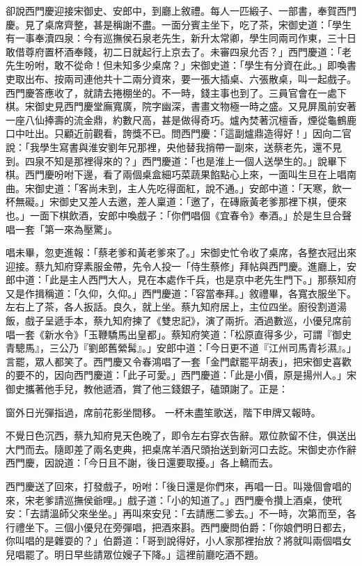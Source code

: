 卻說西門慶迎接宋御史、安郎中，到廳上敘禮。每人一匹緞子、一部書，奉賀西門慶。見了桌席齊整，甚是稱謝不盡。一面分賓主坐下，吃了茶，宋御史道：「學生有一事奉瀆四泉：今有巡撫侯石泉老先生，新升太常卿，學生同兩司作東，三十日敢借尊府置杯酒奉餞，初二日就起行上京去了。未審四泉允否？」西門慶道：「老先生吩咐，敢不從命！但未知多少桌席？」宋御史道：「學生有分資在此。」即喚書吏取出布、按兩司連他共十二兩分資來，要一張大插桌、六張散桌，叫一起戲子。西門慶答應收了，就請去捲棚坐的。不一時，錢主事也到了。三員官會在一處下棋。宋御史見西門慶堂廡寬廣，院字幽深，書畫文物極一時之盛。又見屏風前安著一座八仙捧壽的流金鼎，約數尺高，甚是做得奇巧。爐內焚著沉檀香，煙從龜鶴鹿口中吐出。只顧近前觀看，誇獎不已。問西門慶：「這副爐鼎造得好！」因向二官說：「我學生寫書與淮安劉年兄那裡，央他替我捎帶一副來，送蔡老先，還不見到。四泉不知是那裡得來的？」西門慶道：「也是淮上一個人送學生的。」說畢下棋。西門慶吩咐下邊，看了兩個桌盒細巧菜蔬果餡點心上來，一面叫生旦在上唱南曲。宋御史道：「客尚未到，主人先吃得面紅，說不通。」安郎中道：「天寒，飲一杯無礙。」宋御史又差人去邀，差人稟道：「邀了，在磚廠黃老爹那裡下棋，便來也。」一面下棋飲酒，安郎中喚戲子：「你們唱個《宜春令》奉酒。」於是生旦合聲唱一套「第一來為壓驚」。

唱未畢，忽吏進報：「蔡老爹和黃老爹來了。」宋御史忙令收了桌席，各整衣冠出來迎接。蔡九知府穿素服金帶，先令人投一「侍生蔡修」拜帖與西門慶。進廳上，安郎中道：「此是主人西門大人，見在本處作千兵，也是京中老先生門下。」那蔡知府又是作揖稱道：「久仰，久仰。」西門慶道：「容當奉拜。」敘禮畢，各寬衣服坐下。左右上了茶，各人扳話。良久，就上坐。蔡九知府居上，主位四坐。廚役割道湯飯，戲子呈遞手本，蔡九知府揀了《雙忠記》，演了兩折。酒過數巡，小優兒席前唱一套《新水令》「玉鞭驕馬出皇都」。蔡知府笑道：「松原直得多少，可謂『御史青驄馬』，三公乃『劉郎舊縈髯』。」安郎中道：「今日更不道『江州司馬青衫濕』。」言罷，眾人都笑了。西門慶又令春鴻唱了一套「金門獻罷平胡表」，把宋御史喜歡的要不的，因向西門慶道：「此子可愛。」西門慶道：「此是小價，原是揚州人。」宋御史攜著他手兒，教他遞酒，賞了他三錢銀子，磕頭謝了。正是：

窗外日光彈指過，席前花影坐間移。
一杯未盡笙歌送，階下申牌又報時。

不覺日色沉西，蔡九知府見天色晚了，即令左右穿衣告辭。眾位款留不住，俱送出大門而去。隨即差了兩名吏典，把桌席羊酒尺頭抬送到新河口去訖。宋御史亦作辭西門慶，因說道：「今日且不謝，後日還要取擾。」各上轎而去。

西門慶送了回來，打發戲子，吩咐：「後日還是你們來，再唱一日。叫幾個會唱的來，宋老爹請巡撫侯爺哩。」戲子道：「小的知道了。」西門慶令攢上酒桌，使玳安：「去請溫師父來坐坐。」再叫來安兒：「去請應二爹去。」不一時，次第而至，各行禮坐下。三個小優兒在旁彈唱，把酒來斟。西門慶問伯爵：「你娘們明日都去，你叫唱的是雜耍的？」伯爵道：「哥到說得好，小人家那裡抬放？將就叫兩個唱女兒唱罷了。明日早些請眾位嫂子下降。」這裡前廳吃酒不題。

